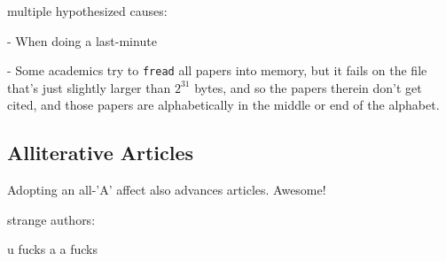 \documentclass[twocolumn]{article}
\begin{document}
multiple hypothesized causes:

- When doing a last-minute

- Some academics try to \verb+fread+ all papers into memory, but
  it fails on the file that's just slightly larger than $2^{31}$ bytes,
  and so the papers therein don't get cited, and those papers are
  alphabetically in the middle or end of the alphabet.



\subsection{Alliterative Articles}

Adopting an all-'A' affect also advances articles.
Awesome!

strange authors:

u fucks
a a fucks




\end{document}
